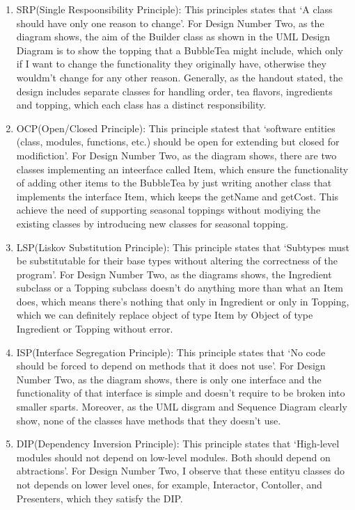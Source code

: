 \documentclass[12pt]{article}
\begin{document}
\begin{enumerate}
    \item SRP(Single Respoonsibility Principle): This principles states that `A class should have only one reason to change'. 
    For Design Number Two, as the diagram shows, the aim of the Builder class as shown in the UML Design Diagram is to show the topping that a BubbleTea might include, which only if I want to change the functionality they originally have, otherwise they wouldm't change for any other reason. 
    Generally, as the handout stated, the design includes separate classes for handling order, tea flavors, ingredients and topping, which each class has a distinct responsibility. 
    \item OCP(Open/Closed Principle): This principle statest that `software entities (class, modules, functions, etc.) should be open for extending but closed for modifiction'.
    For Design Number Two, as the diagram shows, there are two classes implementing an inteerface called Item, which ensure the functionality of adding other items to the BubbleTea by just writing another class that implements the interface Item, which keeps the getName and getCost.
    This achieve the need of supporting seasonal toppings without modiying the existing classes by introducing new classes for seasonal topping.
    \item LSP(Liskov Substitution Principle): This principle states that `Subtypes must be substitutable for their base types without altering the correctness of the program'.
    For Design Number Two, as the diagrams shows, the Ingredient subclass or a Topping subclass doesn't do anything more than what an Item does, which means there's nothing that only in Ingredient or only in Topping, which we can definitely replace object of type Item by Object of type Ingredient or Topping without error.
    \item ISP(Interface Segregation Principle): This principle states that `No code should be forced to depend on methods that it does not use'.
    For Design Number Two, as the diagram shows, there is only one interface and the functionality of that interface is simple and doesn't require to be broken into smaller sparts. 
    Moreover, as the UML disgram and Sequence Diagram clearly show, none of the classes have methods that they doesn't use.
    \item DIP(Dependency Inversion Principle): This principle states that `High-level modules should not depend on low-level modules. Both should depend on abtractions'.
    For Design Number Two, I observe that these entityu classes do not depends on lower level ones, for example, Interactor, Contoller, and Presenters, which they satisfy the DIP.
\end{enumerate}
\end{document}
